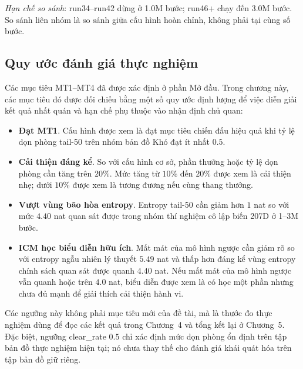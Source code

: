\textit{Hạn chế so sánh}: run34--run42 dừng ở 1.0M bước; run46+ chạy đến 3.0M bước. So sánh liên nhóm là so sánh giữa cấu hình hoàn chỉnh, không phải tại cùng số bước.

\subsection{Quy ước đánh giá thực nghiệm}
\label{sec:eval_thresholds}

Các mục tiêu MT1--MT4 đã được xác định ở phần Mở đầu. Trong chương này, các mục tiêu đó được đối chiếu bằng một số quy ước định lượng để việc diễn giải kết quả nhất quán và hạn chế phụ thuộc vào nhận định chủ quan:

\begin{itemize}
    \item \textbf{Đạt MT1}. Cấu hình được xem là đạt mục tiêu chiến đấu hiệu quả khi tỷ lệ dọn phòng tail-50 trên nhóm bản đồ Khó đạt ít nhất $0.5$.
    \item \textbf{Cải thiện đáng kể}. So với cấu hình cơ sở, phần thưởng hoặc tỷ lệ dọn phòng cần tăng trên $20\%$. Mức tăng từ $10\%$ đến $20\%$ được xem là cải thiện nhẹ; dưới $10\%$ được xem là tương đương nếu cùng thang thưởng.
    \item \textbf{Vượt vùng bão hòa entropy}. Entropy tail-50 cần giảm hơn $1$ nat so với mức $4.40$ nat quan sát được trong nhóm thí nghiệm cô lập biến 207D ở 1--3M bước.
    \item \textbf{ICM học biểu diễn hữu ích}. Mất mát của mô hình ngược cần giảm rõ so với entropy ngẫu nhiên lý thuyết $5.49$ nat và thấp hơn đáng kể vùng entropy chính sách quan sát được quanh $4.40$ nat. Nếu mất mát của mô hình ngược vẫn quanh hoặc trên $4.0$ nat, biểu diễn được xem là có học một phần nhưng chưa đủ mạnh để giải thích cải thiện hành vi.
\end{itemize}

Các ngưỡng này không phải mục tiêu mới của đề tài, mà là thước đo thực nghiệm dùng để đọc các kết quả trong Chương~4 và tổng kết lại ở Chương~5. Đặc biệt, ngưỡng clear\_rate $0.5$ chỉ xác định mức dọn phòng ổn định trên tập bản đồ thực nghiệm hiện tại; nó chưa thay thế cho đánh giá khái quát hóa trên tập bản đồ giữ riêng.

